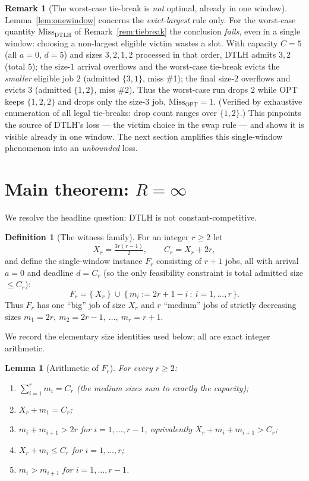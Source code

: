 \documentclass{amsart}
\newtheorem{lemma}[theorem]{Lemma}
\theoremstyle{definition}
\newtheorem{definition}[theorem]{Definition}
\newtheorem{remark}[theorem]{Remark}
\begin{document}
\begin{remark}[The worst-case tie-break is \emph{not} optimal, already in one
window]\label{rem:onewindowbad}
Lemma~\ref{lem:onewindow} concerns the \emph{evict-largest} rule only. For the
worst-case quantity $\mathrm{Miss}_{\mathrm{DTLH}}$ of
Remark~\ref{rem:tiebreak} the conclusion \emph{fails}, even in a single window:
choosing a non-largest eligible victim wastes a slot. With capacity $C=5$
(all $a=0$, $d=5$) and sizes $3,2,1,2$ processed in that order, DTLH admits $3,2$
(total $5$); the size-$1$ arrival overflows and the worst-case tie-break evicts
the \emph{smaller} eligible job $2$ (admitted $\{3,1\}$, miss \#1); the final
size-$2$ overflows and evicts $3$ (admitted $\{1,2\}$, miss \#2). Thus the
worst-case run drops $2$ while OPT keeps $\{1,2,2\}$ and drops only the size-$3$
job, $\mathrm{Miss}_{\mathrm{OPT}}=1$. (Verified by exhaustive enumeration of all
legal tie-breaks: drop count ranges over $\{1,2\}$.) This pinpoints the source of
DTLH's loss --- the victim choice in the swap rule --- and shows it is visible
already in one window. The next section amplifies this single-window phenomenon
into an \emph{unbounded} loss.
\end{remark}

\section{Main theorem: $R=\infty$}\label{sec:main}

We resolve the headline question: DTLH is not constant-competitive.

\begin{definition}[The witness family]\label{def:family}
For an integer $r\ge 2$ let
\[
X_r=\tfrac{3r(r-1)}{2},\qquad C_r=X_r+2r,
\]
and define the single-window instance $F_r$ consisting of $r+1$ jobs, all with
arrival $a=0$ and deadline $d=C_r$ (so the only feasibility constraint is total
admitted size $\le C_r$):
\[
F_r=\Big\{\ X_r\ \Big\}\ \cup\ \big\{\,m_i:=2r+1-i\ :\ i=1,\dots,r\,\big\}.
\]
Thus $F_r$ has one ``big'' job of size $X_r$ and $r$ ``medium'' jobs of strictly
decreasing sizes $m_1=2r,\ m_2=2r-1,\ \dots,\ m_r=r+1$.
\end{definition}

We record the elementary size identities used below; all are exact integer
arithmetic.

\begin{lemma}[Arithmetic of $F_r$]\label{lem:arith}
For every $r\ge 2$:
\begin{enumerate}
\item[(i)] $\sum_{i=1}^{r} m_i = C_r$ (the medium sizes sum to exactly the
capacity);
\item[(ii)] $X_r+m_1=C_r$;
\item[(iii)] $m_i+m_{i+1}>2r$ for $i=1,\dots,r-1$, equivalently
$X_r+m_i+m_{i+1}>C_r$;
\item[(iv)] $X_r+m_i\le C_r$ for $i=1,\dots,r$;
\item[(v)] $m_i>m_{i+1}$ for $i=1,\dots,r-1$.
\end{enumerate}
\end{lemma}
\end{document}
